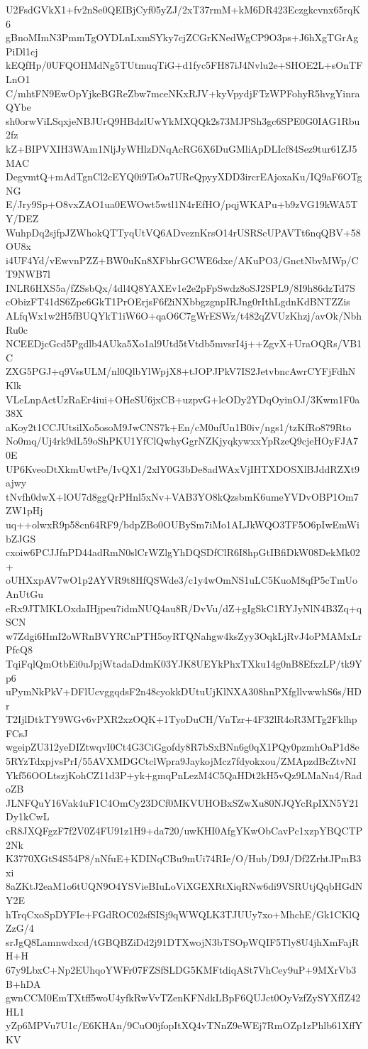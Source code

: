 U2FsdGVkX1+fv2nSe0QEIBjCyf05yZJ/2xT37rmM+kM6DR423Eczgkcvnx65rqK6
gBnoMImN3PmmTgOYDLnLxmSYky7cjZCGrKNedWgCP9O3ps+J6hXgTGrAgPiDl1cj
kEQfHp/0UFQOHMdNg5TUtmuqTiG+d1fyc5FH87iJ4Nvlu2e+SHOE2L+sOnTFLnO1
C/mhtFN9EwOpYjkeBGReZbw7mceNKxRJV+kyVpydjFTzWPFohyR5hvgYinraQYbe
sh0orwViLSqxjeNBJUrQ9HBdzlUwYkMXQQk2s73MJPSh3gc6SPE0G0IAG1Rbu2fz
kZ+BIPVXIH3WAm1NljJyWHlzDNqAcRG6X6DuGMliApDLIcf84Sez9tur61ZJ5MAC
DegvmtQ+mAdTgnCl2cEYQ0i9TsOa7UReQpyyXDD3ircrEAjoxaKu/IQ9aF6OTgNG
E/Jry9Sp+O8vxZAO1ua0EWOwt5wtl1N4rEfHO/pqjWKAPu+b9zVG19kWA5TY/DEZ
WuhpDq2sjfpJZWhokQTTyqUtVQ6ADveznKrsO14rUSRScUPAVTt6nqQBV+58OU8x
i4UF4Yd/vEwvnPZZ+BW0uKn8XFbhrGCWE6dxe/AKuPO3/GnctNbvMWp/CT9NWB7l
INLR6HXS5a/fZSsbQx/4dl4Q8YAXEv1e2e2pFpSwdz8oSJ2SPL9/8I9h86dzTd7S
cObizFT41dS6Zpe6GkT1PrOErjsF6f2iNXbbgzgnpIRJng0rIthLgdnKdBNTZZis
ALfqWx1w2H5fBUQYkT1iW6O+qaO6C7gWrESWz/t482qZVUzKhzj/avOk/NbhRu0c
NCEEDjcGcd5Pgdlb4AUka5Xo1al9Utd5tVtdb5mvsrI4j++ZgvX+UraOQRs/VB1C
ZXG5PGJ+q9VssULM/nl0QlbYlWpjX8+tJOPJPkV7IS2JetvbncAwrCYFjFdhNKlk
VLeLnpActUzRaEr4iui+OHeSU6jxCB+uzpvG+lcODy2YDqOyinOJ/3Kwm1F0a38X
aKoy2t1CCJUtsilXo5osoM9JwCNS7k+En/cM0ufUn1B0iv/ngs1/tzKfRo879Rto
No0mq/Uj4rk9dL59oShPKU1YfClQwhyGgrNZKjyqkywxxYpRzeQ9cjeHOyFJA70E
UP6KveoDtXkmUwtPe/IvQX1/2xlY0G3bDe8adWAxVjIHTXDOSXlBJddRZXt9ajwy
tNvfh0dwX+lOU7d8ggQrPHnl5xNv+VAB3YO8kQzsbmK6umeYVDvOBP1Om7ZW1pHj
uq++olwxR9p58cn64RF9/bdpZBo0OUBySm7iMo1ALJkWQO3TF5O6pIwEmWibZJGS
cxoiw6PCJJfnPD44adRmN0slCrWZlgYhDQSDfClR6I8hpGtIBfiDkW08DekMk02+
oUHXxpAV7wO1p2AYVR9t8HfQSWde3/c1y4wOmNS1uLC5KuoM8qfP5cTmUoAnUtGu
eRx9JTMKLOxdaIHjpeu7idmNUQ4au8R/DvVu/dZ+gIgSkC1RYJyNlN4B3Zq+qSCN
w7Zdgi6HmI2oWRnBVYRCnPTH5oyRTQNahgw4ksZyy3OqkLjRvJ4oPMAMxLrPfcQ8
TqiFqlQmOtbEi0uJpjWtadaDdmK03YJK8UEYkPhxTXku14g0nB8EfxzLP/tk9Yp6
uPymNkPkV+DFlUcvggqdsF2n48cyokkDUtuUjKlNXA308hnPXfgllvwwhS6s/HDr
T2IjlDtkTY9WGv6vPXR2xzOQK+1TyoDuCH/VnTzr+4F32lR4oR3MTg2FklhpFCsJ
wgeipZU312yeDIZtwqvI0Ct4G3CiGgofdy8R7bSxBNn6g0qX1PQy0pzmhOaP1d8e
5RYzTdxpjvsPrI/55AVXMDGCtclWpra9JaykojMcz7fdyokxou/ZMApzdBcZtvNI
Ykf56OOLtszjKohCZ11d3P+yk+gmqPnLezM4C5QaHDt2kH5vQz9LMaNn4/RadoZB
JLNFQuY16Vak4uF1C4OmCy23DCf0MKVUHOBxSZwXu80NJQYcRpIXN5Y21Dy1kCwL
cR8JXQFgzF7f2V0Z4FU91z1H9+da720/uwKHI0AfgYKwObCavPc1xzpYBQCTP2Nk
K3770XGtS4S54P8/nNfuE+KDINqCBu9mUi74RIe/O/Hub/D9J/Df2ZrhtJPmB3xi
8aZKtJ2eaM1o6tUQN9O4YSVieBIuLoViXGEXRtXiqRNw6di9VSRUtjQqbHGdNY2E
hTrqCxoSpDYFIe+FGdROC02sfSISj9qWWQLK3TJUUy7xo+MhchE/Gk1CKlQZzG/4
srJgQ8Lamnwdxcd/tGBQBZiDd2j91DTXwojN3bTSOpWQIF5Tly8U4jhXmFajRH+H
67y9LbxC+Np2EUhqoYWFr07FZSfSLDG5KMFtdiqASt7VhCey9uP+9MXrVb3B+hDA
gwnCCM0EmTXtff5woU4yfkRwVvTZenKFNdkLBpF6QUJct0OyVzfZySYXfIZ42HL1
yZp6MPVu7U1c/E6KHAn/9CuO0jfopItXQ4vTNnZ9eWEj7RmOZp1zPhlb61XffYKV
